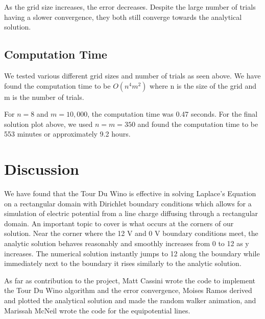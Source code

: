 \documentclass{amsart}
\begin{document}
As the grid size increases, the error decreases. Despite the large number of trials having a slower convergence, they both still converge towards the analytical solution.
\subsection{Computation Time}

We tested various different grid sizes and number of trials as seen above. We have found the computation time to be $O(n^4m^2)$ where n is the size of the grid and m is the number of trials.

For $n = 8$ and $m = 10,000$, the computation time was 0.47 seconds. For the final solution plot above, we used $n = m = 350$ and found the computation time to be 553 minutes or approximately 9.2 hours.

\section{Discussion}
We have found that the Tour Du Wino is effective in solving Laplace's Equation on a rectangular domain with Dirichlet boundary conditions which allows for a simulation of electric potential from a line charge diffusing through a rectangular domain. An important topic to cover is what occurs at the corners of our solution. Near the corner where the 12 V and 0 V boundary conditions meet, the analytic solution behaves reasonably and smoothly increases from 0 to 12 as y increases.
The numerical solution instantly jumps to 12 along the boundary while immediately next to the boundary it rises similarly to the analytic solution.


As far as contribution to the project, Matt Cassini wrote the code to implement the Tour Du Wino algorithm and the error convergence, Moises Ramos derived and plotted the analytical solution and made the random walker animation, and Marissah McNeil wrote the code for the equipotential lines.



\end{document}

